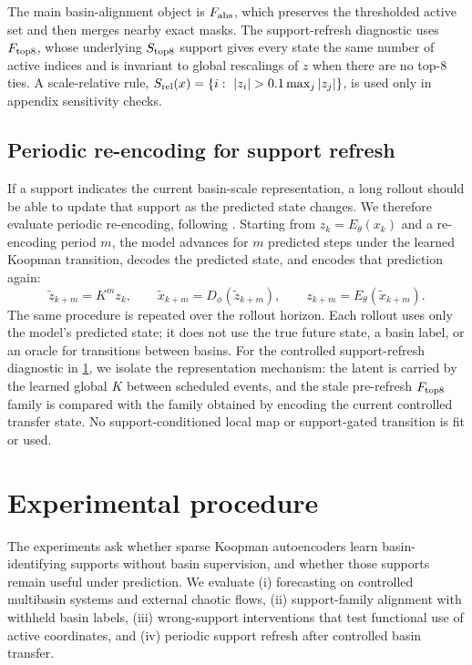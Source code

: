 \documentclass[11pt]{article}
\newcommand{\Enc}{E_\theta}
\newcommand{\Dec}{D_\phi}
\theoremstyle{plain}
\theoremstyle{definition}
\begin{document}
The main basin-alignment object is \(F_{\rm abs}\), which preserves the thresholded active set and then merges nearby exact masks. The support-refresh diagnostic uses \(F_{\rm top8}\), whose underlying \(S_{\rm top8}\) support gives every state the same number of active indices and is invariant to global rescalings of \(z\) when there are no top-\(8\) ties. A scale-relative rule, $S_{\rm rel}(x)=\{i:\ |z_i|>0.1\max_j |z_j|\}$, is used only in appendix sensitivity checks.


\subsection{Periodic re-encoding for support refresh}
\label{sec:method_refresh}
If a support indicates the current basin-scale representation, a long rollout should be able to update that support as the predicted state changes. We therefore evaluate periodic re-encoding, following \citet{fathi2024course}. Starting from $z_k=\Enc(x_k)$ and a re-encoding period $m$, the model advances for $m$ predicted steps under the learned Koopman transition, decodes the predicted state, and encodes that prediction again:
\begin{equation}
  \tilde z_{k+m}=K^m z_k,\qquad
  \tilde x_{k+m}=\Dec(\tilde z_{k+m}),\qquad
  z_{k+m}=\Enc(\tilde x_{k+m}).
  \label{eq:reencode}
\end{equation}
The same procedure is repeated over the rollout horizon. Each rollout uses only the model's predicted state; it does not use the true future state, a basin label, or an oracle for transitions between basins. For the controlled support-refresh diagnostic in \cref{sec:experiments}, we isolate the representation mechanism: the latent is carried by the learned global \(K\) between scheduled events, and the stale pre-refresh \(F_{\rm top8}\) family is compared with the family obtained by encoding the current controlled transfer state. No support-conditioned local map or support-gated transition is fit or used.


\section{Experimental procedure}
\label{sec:experiments}
The experiments ask whether sparse Koopman autoencoders learn basin-identifying supports without basin supervision, and whether those supports remain useful under prediction. We evaluate (i) forecasting on controlled multibasin systems and external chaotic flows, (ii) support-family alignment with withheld basin labels, (iii) wrong-support interventions that test functional use of active coordinates, and (iv) periodic support refresh after controlled basin transfer.
\end{document}

